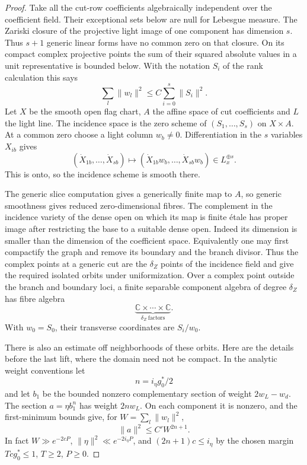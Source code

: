 \begin{proof}
Take all the cut-row coefficients algebraically independent
over the coefficient field. Their exceptional sets below
are null for Lebesgue measure. The Zariski closure of the
projective light image of one component has dimension \(s\).
Thus \(s+1\) generic linear forms have no common zero on
that closure. On its compact complex projective points the
sum of their squared absolute values in a unit representative
is bounded below. With the notation \(S_i\) of the rank
calculation this says
\[
       \sum_l\|w_l\|^2\le C\sum_{i=0}^s\|S_i\|^2 .
\]
Let \(X\) be the smooth open flag chart, \(A\) the affine
space of cut coefficients and \(L\) the light line. The incidence
space is the zero scheme of \((S_1,\ldots,S_s)\) on \(X\times A\).
At a common zero choose a light column \(w_b\ne0\).
Differentiation in the \(s\) variables \(X_{ib}\) gives
\[
 (\dot X_{1b},\ldots,\dot X_{sb})
               \longmapsto(\dot X_{1b}w_b,\ldots,\dot X_{sb}w_b)
                        \in L_x^{\oplus s}.
\]
This is onto, so the incidence scheme is smooth there.

The generic slice computation gives a generically finite
map to \(A\), so generic smoothness gives reduced
zero-dimensional fibres. The complement in the
incidence variety of the dense open on which its map is
finite \'etale has proper image after restricting the base
to a suitable dense open. Indeed its dimension is smaller
than the dimension of the coefficient space. Equivalently
one may first compactify the graph and remove its boundary
and the branch divisor. Thus the complex points at a generic
cut are the \(\delta_Z\) points of the incidence field and
give the required isolated orbits under uniformization.
Over a complex point outside the branch and boundary loci, a finite separable component algebra of degree \(\delta_Z\) has fibre algebra
\[
  \underbrace{\mathbb C\times\cdots\times\mathbb C}_{\delta_Z\ \mathrm{factors}} .
\]
With \(w_0=S_0\), their transverse coordinates are
\(S_i/w_0\).


There is also an estimate off neighborhoods of these
orbits. Here are the details before the last lift, where
the domain need not be compact. In the analytic weight
conventions let 
\[
  n=i_\eta g_0^*/2
\]
 and let \(b_1\)
be the bounded nonzero complementary section of weight
\(2w_L-w_d\). The section \(a=\eta b_1^n\) has weight
\(2n w_L\). On each component it is nonzero, and the
first-minimum bounds give, for \(W=\sum_l\|w_l\|^2\),
\[
                  \|a\|^2\le C' W^{2n+1}.
\]
In fact \(W\gg e^{-2cP}\), \(\|\eta\|^2\ll e^{-2i_\eta P}\),
and \((2n+1)c\le i_\eta\) by the chosen margin
\(Tcg_0^*\le1\), \(T\ge2\), \(P\ge0\).


\end{proof}
